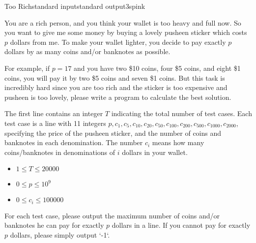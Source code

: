 \begin{problem}{Too Rich}{standard input}{standard output}{3s}{pink}

You are a rich person, and you think your wallet is too heavy and full now.
So you want to give me some money by buying a lovely pusheen sticker which costs $p$ dollars from me.
To make your wallet lighter, you decide to pay exactly $p$ dollars
by as many coins and/or banknotes as possible.

For example, if $p = 17$ and you have two \$10 coins, four \$5 coins, and eight \$1 coins,
you will pay it by two \$5 coins and seven \$1 coins.
But this task is incredibly hard since you are too rich and the sticker is too expensive and pusheen is too lovely, please write a program to calculate the best solution.

\InputFile

The first line contains an integer $T$ indicating the total number of test cases.
Each test case is a line with 11 integers
$p, c_1, c_5, c_{10}, c_{20}, c_{50}, c_{100}, c_{200}, c_{500}, c_{1000}, c_{2000}$,
specifying the price of the pusheen sticker, and the number of coins and banknotes in each denomination.
The number $c_i$ means how many coins/banknotes in denominations of $i$ dollars in your wallet.

\begin{itemize}
\item $1 \le T \le 20000$
\item $0 \le p \le 10^9$
\item $0 \le c_i \le 100000$
\end{itemize}

\OutputFile

For each test case, please output the maximum number of coins and/or banknotes he can pay for exactly $p$ dollars in a line.
If you cannot pay for exactly $p$ dollars, please simply output `-1`.

\Example

\begin{example}
%
\end{example}
\end{problem}
